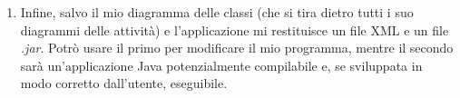 \begin{enumerate}
	\item Infine, salvo il mio diagramma delle classi (che si tira dietro tutti i suo diagrammi delle attività) e l'applicazione mi restituisce un file XML e un file \emph{.jar}. Potrò usare il primo per modificare il mio programma, mentre il secondo sarà un'applicazione Java potenzialmente compilabile e, se sviluppata in modo corretto dall'utente, eseguibile.
\end{enumerate}

